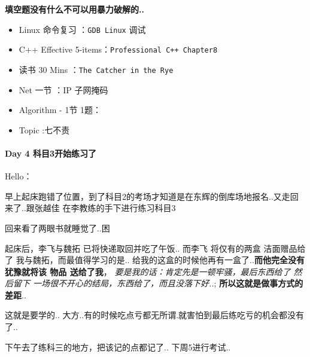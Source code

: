 \documentclass[UTF8,a4paper,8pt]{ctexart}
\begin{document}
	 	  \textbf{填空题没有什么不可以用暴力破解的..}
	 	  \begin{itemize}[itemindent = 1em]
	 	  	\renewcommand\labelitemi{\makebox[0pt][l]{$\square$}\raisebox{.15ex}{\hspace{0.1em}$\checkmark$}}
	 	  	\item   Linux 命令复习 ：\verb|GDB Linux|  调试
	 	  	\item   C++ Effective 5-items：\verb|Professional C++ Chapter8|
	 	  	
	 	  	\item   读书  30 Mins	：\verb|The Catcher in the Rye|	
	 	  	\renewcommand\labelitemi{\makebox[0pt][l]{$\square$}\hspace{1em}} 
	 	  	\item   Net 一节 ：IP 子网掩码	
	 	  	\item   Algorithm - 1节 1题：
	 	  	
	 	  	\renewcommand\labelitemi{\makebox[0pt][l]{$\square$}\raisebox{.15ex}{\hspace{0.1em}$\checkmark$}}
	 	  	\item   Topic :七不责
	 	  \end{itemize}
 	 \paragraph{Day 4  科目3开始练习了    \quad     }Hello：
 	 
	 	 早上起床跑错了位置，到了科目2的考场才知道是在东辉的倒库场地报名..又走回来了..跟张越佳 在李教练的手下进行练习科目3
	 	 
	 	 回来看了两眼书就睡觉了..困
	 	 
	 	 起床后，李飞与魏拓 已将快递取回并吃了午饭.. 而李飞 将仅有的两盒 洁面赠品给了 我与魏拓，而最值得学习的是.. 给我的这盒的时候他再有一盒了..\textbf{而他完全没有犹豫就将该 物品 送给了我}， \textit{要是我的话：肯定先是一顿牢骚，最后东西给了 然后留下 一场很不开心的结局，东西给了，而且没落下好..}; \textbf{所以这就是做事方式的差距}.. 
	 	 
	 	 这就是要学的.. 大方..有的时候吃点亏都无所谓.就害怕到最后练吃亏的机会都没有了..
	 	 
	 	 下午去了练科三的地方，把该记的点都记了.. 下周5进行考试..
 	 
\end{document}
